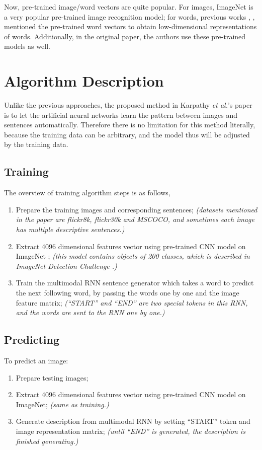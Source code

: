 \documentclass[10pt,twocolumn,letterpaper]{article}
\begin{document}
Now, pre-trained image/word vectors are quite popular.
For images, ImageNet \cite{imagenet} is a very popular pre-trained image recognition model;
for words, previous works \cite{bengio}, \cite{socher2}, \cite{mikolov} mentioned the pre-trained word vectors
to obtain low-dimensional representations of words.
Additionally, in the original paper, the authors use these pre-trained models as well.


\section{Algorithm Description}
Unlike the previous approaches, the proposed method in Karpathy \textit{et al.}'s paper is to let the artificial neural networks
learn the pattern between images and sentences automatically.
Therefore there is no limitation for this method literally,
because the training data can be arbitrary, and the model thus will be adjusted by the training data.

\subsection{Training}
The overview of training algorithm steps is as follows,
\begin{enumerate}
    \item Prepare the training images and corresponding sentences;
          \textit{(datasets mentioned in the paper are flickr8k, flickr30k and MSCOCO,
          and sometimes each image has multiple descriptive sentences.)}
    \item Extract 4096 dimensional features vector using pre-trained CNN model on ImageNet \cite{imagenet};
          \textit{(this model contains objects of 200 classes, which is described in ImageNet Detection Challenge \cite{inch}.)}
    \item Train the multimodal RNN sentence generator which takes a word to predict the next following word, by passing the words one by one and the image feature matrix;
          \textit{(``START'' and ``END'' are two special tokens in this RNN, and the words are sent to the RNN one by one.)}
\end{enumerate}

\subsection{Predicting}
To predict an image:
\begin{enumerate}
    \item Prepare testing images;
    \item Extract 4096 dimensional features vector using pre-trained CNN model on ImageNet;
          \textit{(same as training.)}
    \item Generate description from multimodal RNN by setting ``START'' token and image representation matrix;
          \textit{(until ``END'' is generated, the description is finished generating.)}
\end{enumerate}
\end{document}
